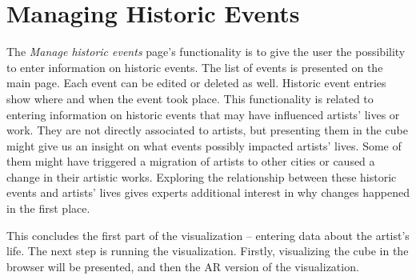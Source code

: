 \section{Managing Historic Events}\label{sec:managing-historic-events}
The \emph{Manage historic events} page's functionality is to give the user the possibility to enter information on historic events. The list of
events is presented on the main page. Each event can be edited or deleted as well. Historic event entries show where and when the event took place. This
functionality is related to entering information on historic events that may have influenced artists' lives or work. They are not directly
associated to artists, but presenting them in the cube might give us an insight on what events possibly impacted artists' lives. Some of them might
have triggered a migration of artists to other cities or caused a change in their artistic works. Exploring the relationship between these
historic events and artists' lives gives experts additional interest in why changes happened in the first place.

This concludes the first part of the visualization -- entering data about the artist's life. The next step is running the
visualization. Firstly, visualizing the cube in the browser will be presented, and then the AR version of the visualization.

\clearpage